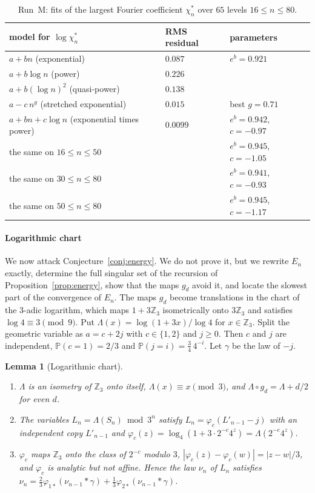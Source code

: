 \documentclass[12pt]{amsart}
\newtheorem{lemma}{Lemma}
\theoremstyle{definition}
\theoremstyle{remark}
\newcommand{\Z}{\mathbb{Z}}
\begin{document}
\begin{table}[tp]
\centering
\small
\begin{tabular}{@{}lll@{}}
\toprule
model for $\log\chi^*_n$ & RMS residual & parameters\\
\midrule
$a+bn$ (exponential) & $0.087$ & $e^b=0.921$\\
$a+b\log n$ (power) & $0.226$ & \\
$a+b(\log n)^2$ (quasi-power) & $0.138$ & \\
$a-c\,n^g$ (stretched exponential) & $0.015$ & best $g=0.71$\\
$a+bn+c\log n$ (exponential times power) & $0.0099$ & $e^b=0.942$, $c=-0.97$\\
\quad the same on $16\le n\le50$ & & $e^b=0.945$, $c=-1.05$\\
\quad the same on $30\le n\le80$ & & $e^b=0.941$, $c=-0.93$\\
\quad the same on $50\le n\le80$ & & $e^b=0.945$, $c=-1.17$\\
\bottomrule
\end{tabular}
\caption{Run~M: fits of the largest Fourier coefficient $\chi^*_n$ over $65$ levels $16\le n\le80$.}
\label{table:syr-fourier}
\end{table}

\paragraph{Logarithmic chart} We now attack Conjecture~\ref{conj:energy}. We do not prove it, but we rewrite $E_n$ exactly, determine the full singular set of the recursion of Proposition~\ref{prop:energy}, show that the maps $g_d$ avoid it, and locate the slowest part of the convergence of $E_n$. The maps $g_d$ become translations in the chart of the $3$-adic logarithm, which maps $1+3\Z_3$ isometrically onto $3\Z_3$ and satisfies $\log4\equiv3\pmod9$. Put $\Lambda(x)=\log(1+3x)/\log4$ for $x\in\Z_3$. Split the geometric variable as $a=c+2j$ with $c\in\{1,2\}$ and $j\ge0$. Then $c$ and $j$ are independent, $\mathbb P(c=1)=2/3$ and $\mathbb P(j=i)=\frac34\,4^{-i}$. Let $\gamma$ be the law of $-j$.

\begin{lemma}[Logarithmic chart]
\label{lem:logchart}
\leavevmode\begin{enumerate}
\item[(a)] $\Lambda$ is an isometry of $\Z_3$ onto itself, $\Lambda(x)\equiv x\pmod3$, and $\Lambda\circ g_d=\Lambda+d/2$ for even $d$.
\item[(b)] The variables $L_n=\Lambda(S_n)\bmod3^n$ satisfy $L_n=\varphi_c(L'_{n-1}-j)$ with an independent copy $L'_{n-1}$ and $\varphi_c(z)=\log_4(1+3\cdot2^{-c}4^z)=\Lambda(2^{-c}4^z)$.
\item[(c)] $\varphi_c$ maps $\Z_3$ onto the class of $2^{-c}$ modulo $3$, $|\varphi_c(z)-\varphi_c(w)|=|z-w|/3$, and $\varphi_c$ is analytic but not affine. Hence the law $\nu_n$ of $L_n$ satisfies $\nu_n=\frac23\varphi_{1*}(\nu_{n-1}*\gamma)+\frac13\varphi_{2*}(\nu_{n-1}*\gamma)$.
\end{enumerate}
\end{lemma}
\end{document}
